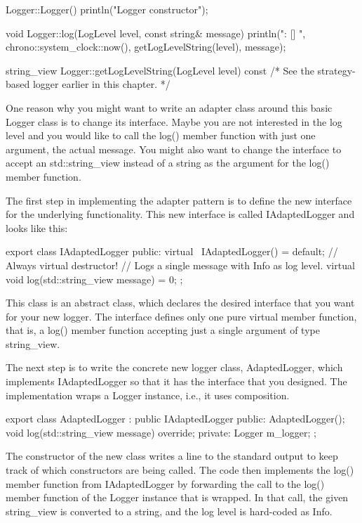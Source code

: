 \begin{cpp}
Logger::Logger() { println("Logger constructor"); }

void Logger::log(LogLevel level, const string& message)
{
    println("{}: [{}] {}", chrono::system_clock::now(),
    getLogLevelString(level), message);
}

string_view Logger::getLogLevelString(LogLevel level) const
{ /* See the strategy-based logger earlier in this chapter. */ }
\end{cpp}

One reason why you might want to write an adapter class around this basic Logger class is to change its interface. Maybe you are not interested in the log level and you would like to call the log() member function with just one argument, the actual message. You might also want to change the interface to accept an std::string\_view instead of a string as the argument for the log() member function.


The first step in implementing the adapter pattern is to define the new interface for the underlying functionality. This new interface is called IAdaptedLogger and looks like this:

\begin{cpp}
export class IAdaptedLogger
{
    public:
        virtual ~IAdaptedLogger() = default; // Always virtual destructor!
        // Logs a single message with Info as log level.
        virtual void log(std::string_view message) = 0;
};
\end{cpp}

This class is an abstract class, which declares the desired interface that you want for your new logger. The interface defines only one pure virtual member function, that is, a log() member function accepting just a single argument of type string\_view.

The next step is to write the concrete new logger class, AdaptedLogger, which implements IAdaptedLogger so that it has the interface that you designed. The implementation wraps a Logger instance, i.e., it uses composition.

\begin{cpp}
export class AdaptedLogger : public IAdaptedLogger
{
    public:
        AdaptedLogger();
        void log(std::string_view message) override;
    private:
        Logger m_logger;
};
\end{cpp}

The constructor of the new class writes a line to the standard output to keep track of which constructors are being called. The code then implements the log() member function from IAdaptedLogger by forwarding the call to the log() member function of the Logger instance that is wrapped. In that call, the given string\_view is converted to a string, and the log level is hard-coded as Info.

